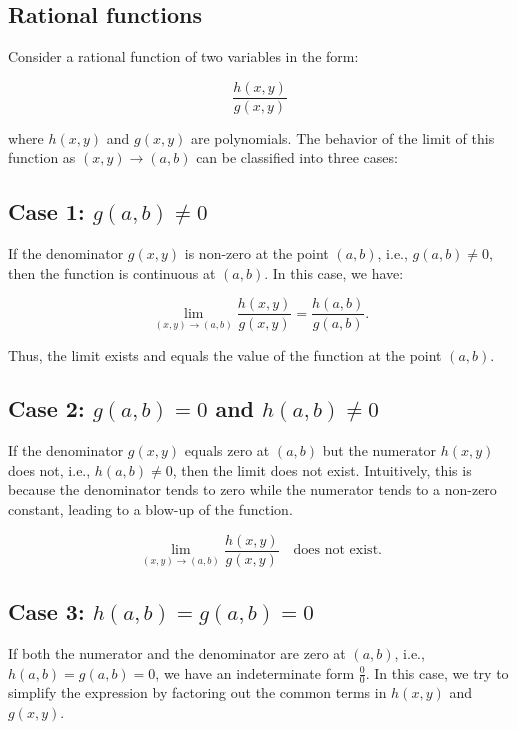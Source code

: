 \documentclass{report}
\begin{document}
\subsection{Rational functions}
Consider a rational function of two variables in the form:

\[
	\frac{h(x, y)}{g(x, y)}
\]

where \( h(x, y) \) and \( g(x, y) \) are polynomials. The behavior of the limit of this function as \( (x, y) \to (a, b) \) can be classified into three cases:

\subsection{Case 1: \( g(a, b) \neq 0 \)}

If the denominator \( g(x, y) \) is non-zero at the point \( (a, b) \), i.e., \( g(a, b) \neq 0 \), then the function is continuous at \( (a, b) \). In this case, we have:

\[
	\lim_{(x, y) \to (a, b)} \frac{h(x, y)}{g(x, y)} = \frac{h(a, b)}{g(a, b)}.
\]

Thus, the limit exists and equals the value of the function at the point \( (a, b) \).

\subsection{Case 2: \( g(a, b) = 0 \) and \( h(a, b) \neq 0 \)}

If the denominator \( g(x, y) \) equals zero at \( (a, b) \) but the numerator \( h(x, y) \) does not, i.e., \( h(a, b) \neq 0 \), then the limit does not exist. Intuitively, this is because the denominator tends to zero while the numerator tends to a non-zero constant, leading to a blow-up of the function.

\[
	\lim_{(x, y) \to (a, b)} \frac{h(x, y)}{g(x, y)} \quad \text{does not exist}.
\]

\subsection{Case 3: \( h(a, b) = g(a, b) = 0 \)}

If both the numerator and the denominator are zero at \( (a, b) \), i.e., \( h(a, b) = g(a, b) = 0 \), we have an indeterminate form \( \frac{0}{0} \). In this case, we try to simplify the expression by factoring out the common terms in \( h(x, y) \) and \( g(x, y) \).
\end{document}
